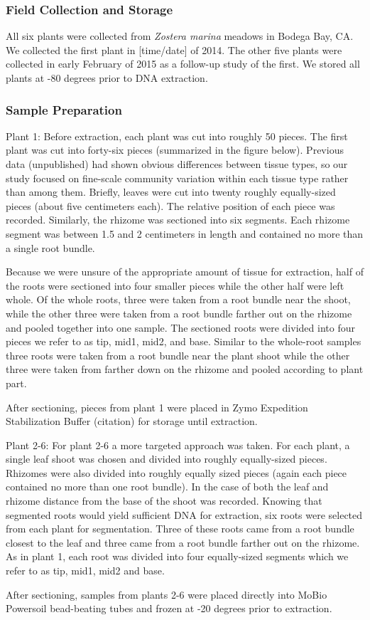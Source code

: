 
\subsubsection{\textbf{Field Collection and Storage}}

    All six plants were collected from \textit{Zostera marina} meadows in Bodega Bay, CA. We collected the first plant in [time/date] of 2014. The other five plants were collected in early February of 2015 as a follow-up study of the first. We stored all plants at -80 degrees prior to DNA extraction. 

\subsubsection{\textbf{Sample Preparation}}
Plant 1:
Before extraction, each plant was cut into roughly 50 pieces. The first plant was cut into forty-six pieces (summarized in the figure below). Previous data (unpublished) had shown obvious differences between tissue types, so our study focused on fine-scale community variation within each tissue type rather than among them. Briefly, leaves were cut into twenty roughly equally-sized pieces (about five centimeters each). The relative position of each piece was recorded. Similarly, the rhizome was sectioned into six segments. Each rhizome segment was between 1.5 and 2 centimeters in length and contained no more than a single root bundle.

Because we were unsure of the appropriate amount of tissue for extraction, half of the roots were sectioned into four smaller pieces while the other half were left whole. Of the whole roots, three were taken from a root bundle near the shoot, while the other three were taken from a root bundle farther out on the rhizome and pooled together into one sample. The sectioned roots were divided into four pieces we refer to as tip, mid1, mid2, and base. Similar to the whole-root samples three roots were taken from a root bundle near the plant shoot while the other three were taken from farther down on the rhizome and pooled according to plant part. 

After sectioning, pieces from plant 1 were placed in Zymo Expedition Stabilization Buffer (citation) for storage until extraction.

Plant 2-6:
For plant 2-6 a more targeted approach was taken. For each plant, a single leaf shoot was chosen and divided into roughly equally-sized pieces. Rhizomes were also divided into roughly equally sized pieces (again each piece contained no more than one root bundle). In the case of both the leaf and rhizome distance from the base of the shoot was recorded. Knowing that segmented roots would yield sufficient DNA for extraction, six roots were selected from each plant for segmentation. Three of these roots came from a root bundle closest to the leaf and three came from a root bundle farther out on the rhizome. As in plant 1, each root was divided into four equally-sized segments which we refer to as tip, mid1, mid2 and base. 

After sectioning, samples from plants 2-6 were placed directly into MoBio Powersoil bead-beating tubes and frozen at -20 degrees prior to extraction.
    